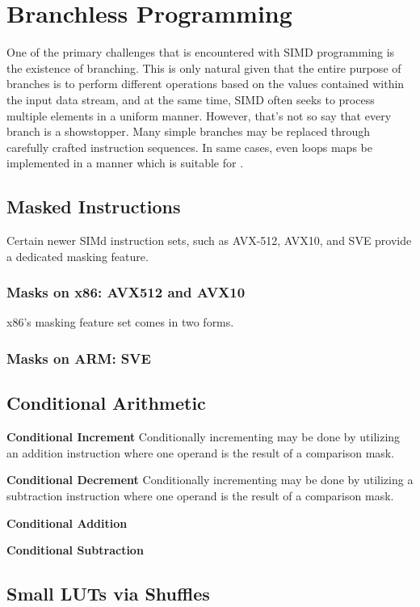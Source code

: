 \chapter{Branchless Programming}
One of the primary challenges that is encountered with SIMD programming is the
existence of branching. This is only natural given that the entire purpose of
branches is to perform different operations based on the values contained within
the input data stream, and at the same time, SIMD often seeks to process
multiple elements in a uniform manner. However, that's not so say that every
branch is a showstopper. Many simple branches may be replaced through carefully
crafted instruction sequences. In same cases, even loops maps be implemented in
a manner which is suitable for .

\section{}

\section{Masked Instructions}
Certain newer SIMd instruction sets, such as AVX-512, AVX10, and SVE provide a
dedicated masking feature.

\subsection{Masks on x86: AVX512 and AVX10}
x86's masking feature set comes in two forms.

\subsection{Masks on ARM: SVE}

\section{Conditional Arithmetic}


\textbf{Conditional Increment} Conditionally incrementing may be done by
utilizing an addition instruction where one operand is the result of a
comparison mask.

\textbf{Conditional Decrement} Conditionally incrementing may be done by
utilizing a subtraction instruction where one operand is the result of a
comparison mask.

\textbf{Conditional Addition}

\textbf{Conditional Subtraction}

\section{Small LUTs via Shuffles}
